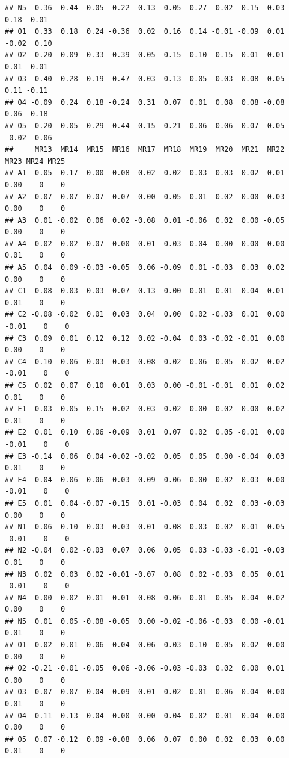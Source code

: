 \documentclass[
]{ctexart}
\begin{document}
\begin{verbatim}
## N5 -0.36  0.44 -0.05  0.22  0.13  0.05 -0.27  0.02 -0.15 -0.03  0.18 -0.01
## O1  0.33  0.18  0.24 -0.36  0.02  0.16  0.14 -0.01 -0.09  0.01 -0.02  0.10
## O2 -0.20  0.09 -0.33  0.39 -0.05  0.15  0.10  0.15 -0.01 -0.01  0.01  0.01
## O3  0.40  0.28  0.19 -0.47  0.03  0.13 -0.05 -0.03 -0.08  0.05  0.11 -0.11
## O4 -0.09  0.24  0.18 -0.24  0.31  0.07  0.01  0.08  0.08 -0.08  0.06  0.18
## O5 -0.20 -0.05 -0.29  0.44 -0.15  0.21  0.06  0.06 -0.07 -0.05 -0.02 -0.06
##     MR13  MR14  MR15  MR16  MR17  MR18  MR19  MR20  MR21  MR22  MR23 MR24 MR25
## A1  0.05  0.17  0.00  0.08 -0.02 -0.02 -0.03  0.03  0.02 -0.01  0.00    0    0
## A2  0.07  0.07 -0.07  0.07  0.00  0.05 -0.01  0.02  0.00  0.03  0.00    0    0
## A3  0.01 -0.02  0.06  0.02 -0.08  0.01 -0.06  0.02  0.00 -0.05  0.00    0    0
## A4  0.02  0.02  0.07  0.00 -0.01 -0.03  0.04  0.00  0.00  0.00  0.01    0    0
## A5  0.04  0.09 -0.03 -0.05  0.06 -0.09  0.01 -0.03  0.03  0.02  0.00    0    0
## C1  0.08 -0.03 -0.03 -0.07 -0.13  0.00 -0.01  0.01 -0.04  0.01  0.01    0    0
## C2 -0.08 -0.02  0.01  0.03  0.04  0.00  0.02 -0.03  0.01  0.00 -0.01    0    0
## C3  0.09  0.01  0.12  0.12  0.02 -0.04  0.03 -0.02 -0.01  0.00  0.00    0    0
## C4  0.10 -0.06 -0.03  0.03 -0.08 -0.02  0.06 -0.05 -0.02 -0.02 -0.01    0    0
## C5  0.02  0.07  0.10  0.01  0.03  0.00 -0.01 -0.01  0.01  0.02  0.01    0    0
## E1  0.03 -0.05 -0.15  0.02  0.03  0.02  0.00 -0.02  0.00  0.02  0.01    0    0
## E2  0.01  0.10  0.06 -0.09  0.01  0.07  0.02  0.05 -0.01  0.00 -0.01    0    0
## E3 -0.14  0.06  0.04 -0.02 -0.02  0.05  0.05  0.00 -0.04  0.03  0.01    0    0
## E4  0.04 -0.06 -0.06  0.03  0.09  0.06  0.00  0.02 -0.03  0.00 -0.01    0    0
## E5  0.01  0.04 -0.07 -0.15  0.01 -0.03  0.04  0.02  0.03 -0.03  0.00    0    0
## N1  0.06 -0.10  0.03 -0.03 -0.01 -0.08 -0.03  0.02 -0.01  0.05 -0.01    0    0
## N2 -0.04  0.02 -0.03  0.07  0.06  0.05  0.03 -0.03 -0.01 -0.03  0.01    0    0
## N3  0.02  0.03  0.02 -0.01 -0.07  0.08  0.02 -0.03  0.05  0.01 -0.01    0    0
## N4  0.00  0.02 -0.01  0.01  0.08 -0.06  0.01  0.05 -0.04 -0.02  0.00    0    0
## N5  0.01  0.05 -0.08 -0.05  0.00 -0.02 -0.06 -0.03  0.00 -0.01  0.01    0    0
## O1 -0.02 -0.01  0.06 -0.04  0.06  0.03 -0.10 -0.05 -0.02  0.00  0.00    0    0
## O2 -0.21 -0.01 -0.05  0.06 -0.06 -0.03 -0.03  0.02  0.00  0.01  0.00    0    0
## O3  0.07 -0.07 -0.04  0.09 -0.01  0.02  0.01  0.06  0.04  0.00  0.01    0    0
## O4 -0.11 -0.13  0.04  0.00  0.00 -0.04  0.02  0.01  0.04  0.00  0.00    0    0
## O5  0.07 -0.12  0.09 -0.08  0.06  0.07  0.00  0.02  0.03  0.00  0.01    0    0

\end{verbatim}
\end{document}
